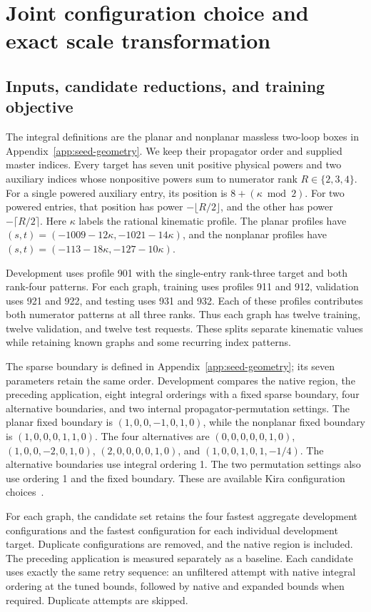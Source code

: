 \section{Joint configuration choice and exact scale transformation}
\label{app:joint-policy}
\subsection{Inputs, candidate reductions, and training objective}
The integral definitions are the planar and nonplanar massless two-loop boxes in Appendix~\ref{app:seed-geometry}. We keep their propagator order and supplied master indices. Every target has seven unit positive physical powers and two auxiliary indices whose nonpositive powers sum to numerator rank $R\in\{2,3,4\}$. For a single powered auxiliary entry, its position is $8+(\kappa\bmod 2)$. For two powered entries, that position has power $-\lfloor R/2\rfloor$, and the other has power $-\lceil R/2\rceil$. Here $\kappa$ labels the rational kinematic profile. The planar profiles have $(s,t)=(-1009-12\kappa,-1021-14\kappa)$, and the nonplanar profiles have $(s,t)=(-113-18\kappa,-127-10\kappa)$.

Development uses profile 901 with the single-entry rank-three target and both rank-four patterns. For each graph, training uses profiles 911 and 912, validation uses 921 and 922, and testing uses 931 and 932. Each of these profiles contributes both numerator patterns at all three ranks. Thus each graph has twelve training, twelve validation, and twelve test requests. These splits separate kinematic values while retaining known graphs and some recurring index patterns.

The sparse boundary is defined in Appendix~\ref{app:seed-geometry}; its seven parameters retain the same order. Development compares the native region, the preceding application, eight integral orderings with a fixed sparse boundary, four alternative boundaries, and two internal propagator-permutation settings. The planar fixed boundary is $(1,0,0,-1,0,1,0)$, while the nonplanar fixed boundary is $(1,0,0,0,1,1,0)$. The four alternatives are $(0,0,0,0,0,1,0)$, $(1,0,0,-2,0,1,0)$, $(2,0,0,0,0,1,0)$, and $(1,0,0,1,0,1,-1/4)$. The alternative boundaries use integral ordering 1. The two permutation settings also use ordering 1 and the fixed boundary. These are available Kira configuration choices~\cite{Kira2,Kira3}.

For each graph, the candidate set retains the four fastest aggregate development configurations and the fastest configuration for each individual development target. Duplicate configurations are removed, and the native region is included. The preceding application is measured separately as a baseline. Each candidate uses exactly the same retry sequence: an unfiltered attempt with native integral ordering at the tuned bounds, followed by native and expanded bounds when required. Duplicate attempts are skipped.

